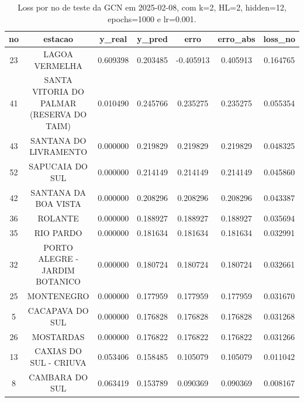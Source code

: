 \begin{table}[h]
\centering
\caption{Loss por no de teste da GCN em 2025-02-08, com k=2, HL=2, hidden=12, epochs=1000 e lr=0.001.}
\label{tab:gcn_loss_k2_hl2_h12_e1000_d20250208}
\begin{tabular}{ccccccc}
\toprule
no & estacao & y\_real & y\_pred & erro & erro\_abs & loss\_no \\
\midrule
23 & LAGOA VERMELHA & 0.609398 & 0.203485 & -0.405913 & 0.405913 & 0.164765 \\
41 & SANTA VITORIA DO PALMAR (RESERVA DO TAIM) & 0.010490 & 0.245766 & 0.235275 & 0.235275 & 0.055354 \\
43 & SANTANA DO LIVRAMENTO & 0.000000 & 0.219829 & 0.219829 & 0.219829 & 0.048325 \\
52 & SAPUCAIA DO SUL & 0.000000 & 0.214149 & 0.214149 & 0.214149 & 0.045860 \\
42 & SANTANA DA BOA VISTA & 0.000000 & 0.208296 & 0.208296 & 0.208296 & 0.043387 \\
36 & ROLANTE & 0.000000 & 0.188927 & 0.188927 & 0.188927 & 0.035694 \\
35 & RIO PARDO & 0.000000 & 0.181634 & 0.181634 & 0.181634 & 0.032991 \\
32 & PORTO ALEGRE - JARDIM BOTANICO & 0.000000 & 0.180724 & 0.180724 & 0.180724 & 0.032661 \\
25 & MONTENEGRO & 0.000000 & 0.177959 & 0.177959 & 0.177959 & 0.031670 \\
5 & CACAPAVA DO SUL & 0.000000 & 0.176828 & 0.176828 & 0.176828 & 0.031268 \\
26 & MOSTARDAS & 0.000000 & 0.176822 & 0.176822 & 0.176822 & 0.031266 \\
13 & CAXIAS DO SUL - CRIUVA & 0.053406 & 0.158485 & 0.105079 & 0.105079 & 0.011042 \\
8 & CAMBARA DO SUL & 0.063419 & 0.153789 & 0.090369 & 0.090369 & 0.008167 \\
\bottomrule
\end{tabular}
\end{table}
